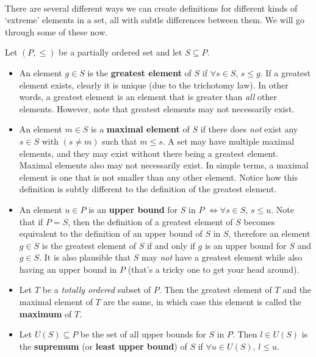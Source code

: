 \documentclass[../real_analysis.tex]{subfiles}
\begin{document}
        \paragraph{}
        There are several different ways we can create definitions for different kinds of `extreme' elements in a set, all with subtle differences between them. We will go through some of these now.
        \begin{definition}
            Let $(P, \leq)$ be a partially ordered set and let $S \subseteq P$.
            \begin{itemize}
                \item An element $g \in S$ is the \textbf{greatest element} of $S$ if $\forall s \in S,\, s \leq g$. If a greatest element exists, clearly it is unique (due to the trichotomy law).
                In other words, a greatest element is an element that is greater than \textit{all} other elements. However, note that greatest elements may not necessarily exist.
                \item An element $m \in S$ is a \textbf{maximal element} of $S$ if there does \textit{not} exist any $s \in S$ with $(s \neq m)$ such that $m \leq s$. A set may have multiple maximal elements, and they may exist without there being a greatest element. Maximal elements also may not necessarily exist.
                In simple terms, a maximal element is one that is not smaller than any other element. Notice how this definition is subtly different to the definition of the greatest element.
                \item An element $u \in P$ is an \textbf{upper bound} for $S$ in $P$ $\iff \forall s \in S,\, s \leq u$.
                Note that if $P=S$, then the definition of a greatest element of $S$ becomes equivalent to the definition of an upper bound of $S$ in $S$, therefore an element $g \in S$ is the greatest element of $S$ if and only if $g$ is an upper bound for $S$ and $g \in S$. It is also plausible that $S$ may \textit{not} have a greatest element while also having an upper bound in $P$ (that's a tricky one to get your head around).
                \item Let $T$ be a \textit{totally ordered} subset of $P$. Then the greatest element of $T$ and the maximal element of $T$ are the same, in which case this element is called the \textbf{maximum} of $T$.
                \item Let $U(S) \subseteq P$ be the set of all upper bounds for $S$ in $P$. Then $l \in U(S)$ is the \textbf{supremum} (or \textbf{least upper bound}) of $S$ if $\forall u \in U(S),\, l \leq u$.

\end{itemize}
\end{definition}
\end{document}
